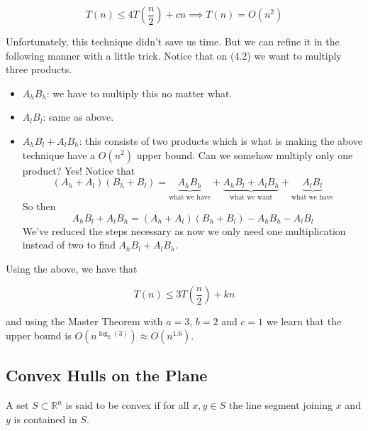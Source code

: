 $$
T(n) \leq 4T(\frac{n}{2}) + cn \implies T(n) = O(n^2)
$$

Unfortunately, this technique didn't save us time. But we can refine
it in the following manner with a little trick. Notice that 
on (4.2) we want to multiply three products.

\begin{itemize}
    \item $A_hB_h$: we have to multiply this no matter what.
    \item $A_lB_l$: same as above.
    \item $A_hB_l + A_lB_h$: this consists of two products which is
    what is making the above technique have a $O(n^2)$ upper bound.
    Can we somehow multiply only one product? Yes! Notice that
    $$
    (A_h + A_l)(B_h + B_l) = \underbrace{A_hB_h}_{\text{what we have}}
    + \underbrace{A_hB_l + A_lB_h}_{\text{what we want}} +
    \underbrace{A_lB_l}_{\text{what we have}}
    $$
    So then
    $$
    A_hB_l + A_lB_h = (A_h + A_l)(B_h + B_l) - A_hB_h - A_lB_l
    $$
    We've reduced the steps necessary as now we only need one
    multiplication instead of two to find $A_hB_l + A_lB_h$.
\end{itemize}

Using the above, we have that

$$
T(n) \leq 3T(\frac{n}{2}) + kn
$$

and using the Master Theorem with $a = 3$, $b = 2$ and $c = 1$ we
learn that the upper bound is $O(n^{\log_2(3)}) \approx O(n^{1.6})$.

\subsection{Convex Hulls on the Plane}

\begin{definition}
    A set $S \subset \mathbb{R}^n$ is said to be convex if for all
    $x, y \in S$ the line segment joining $x$ and $y$ is contained in
    $S$.
\end{definition}

